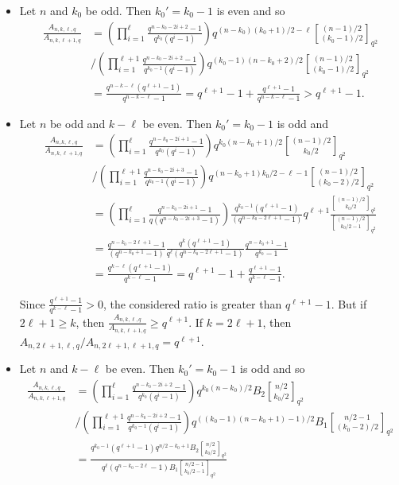 \documentclass[a4paper,11pt]{article}
\begin{document}
\begin{itemize}
Otherwise, if $n\equiv 2\pmod 4$ and $q\equiv 3\pmod 4$, then $\eta((-1)^{n/2})=-1$, therefore
$$\frac{A_{n,k,\ell,q}}{A_{n,k,\ell+1,q}}= \frac{q^{n/2-\ell-1}}{q^{n/2-\ell-1}-1}(q^{\ell+1}-1)> q^{\ell+1}-1.$$


\item Let $n$ and $k_0$ be odd. Then $k_0'=k_0-1$ is even and so %
\begin{align*}
  \frac{A_{n,k,\ell,q}}{A_{n,k,\ell+1,q}} & =\left(\prod_{i=1}^{\ell}\frac{q^{n-k_0-2i+2}-1}{q^{k_0}(q^i-1)}\right)q^{(n-k_0)(k_0+1)/2-\ell}{(n-1)/2\brack(k_0-1)/2 }_{q^2}\\ &/\left(\prod_{i=1}^{\ell+1}\frac{q^{n-k_0-2i+2}-1}{q^{k_0-1}(q^i-1)}\right)q^{(k_0-1)(n-k_0+2)/2}{(n-1)/2\brack (k_0-1)/2 }_{q^2} \\
  & =\frac{q^{n-k-\ell}(q^{\ell+1}-1)}{q^{n-k-\ell}-1}=q^{\ell+1}-1+\frac{q^{\ell+1}-1}{q^{n-k-\ell}-1}>q^{\ell+1}-1.
\end{align*}

\item Let $n$ be odd and $k-\ell$ be even. Then $k_0'=k_0-1$ is odd and  %
\begin{align*}
  \frac{A_{n,k,\ell,q}}{A_{n,k,\ell+1,q}} & =\left(\prod_{i=1}^\ell\frac{q^{n-k_0-2i+1}-1}{q^{k_0}(q^i-1)}\right)q^{k_0(n-k_0+1)/2}{(n-1)/2\brack k_0/2 }_{q^2}\\ &/\left(\prod_{i=1}^{\ell+1}\frac{q^{n-k_0-2i+3}-1}{q^{k_0-1}(q^i-1)}\right)q^{(n-k_0+1)k_0/2-\ell-1}{(n-1)/2\brack(k_0-2)/2 }_{q^2} \\
  &=\left(\prod_{i=1}^\ell\frac{q^{n-k_0-2i+1}-1}{q(q^{n-k_0-2i+3}-1)}\right)\frac{q^{k_0-1}(q^{\ell+1}-1)}{(q^{n-k_0-2\ell+1}-1)}q^{\ell+1}\frac{{(n-1)/2\brack k_0/2 }_{q^2}}{{(n-1)/2\brack k_0/2-1 }_{q^2}}\\
  &=\frac{q^{n-k_0-2\ell+1}-1}{(q^{n-k_0+1}-1)}\frac{q^{k}(q^{\ell+1}-1)}{q^\ell(q^{n-k_0-2\ell+1}-1)}\frac{q^{n-k_0+1}-1}{q^{k_0}-1}\\
  &=\frac{q^{k-\ell}(q^{\ell+1}-1)}{q^{k-\ell}-1}=q^{\ell+1}-1+\frac{q^{\ell+1}-1}{q^{k-\ell}-1}.
\end{align*}

Since $\frac{q^{\ell+1}-1}{q^{k-\ell}-1}>0$, the considered ratio is greater than $q^{\ell+1}-1$. But if $2\ell+1\ge k$, then $\frac{A_{n,k,\ell,q}}{A_{n,k,\ell+1,q}}\ge q^{\ell+1}$. If $k=2\ell+1$, then $A_{n,2\ell+1,\ell,q}/A_{n,2\ell+1,\ell+1,q}=q^{\ell+1}.$

\item Let $n$ and $k-\ell$ be even. Then $k_0'=k_0-1$ is odd and so %
\begin{align*}
  \frac{A_{n,k,\ell,q}}{A_{n,k,\ell+1,q}} & =\left(\prod_{i=1}^{\ell}\frac{q^{n-k_0-2i+2}-1}{q^{k_0}(q^i-1)}\right)q^{k_0(n-k_0)/2}B_2{n/2\brack k_0/2 }_{q^2}\\ &/\left(\prod_{i=1}^{\ell+1}\frac{q^{n-k_0-2i+2}-1}{q^{k_0-1}(q^i-1)}\right)q^{((k_0-1)(n-k_0+1)-1)/2}B_1{n/2-1\brack(k_0-2)/2 }_{q^2} \\
  &=\frac{q^{k_0-1}(q^{\ell+1}-1)q^{n/2-k_0+1}B_2{n/2\brack k_0/2 }_{q^2}}{q^\ell(q^{n-k_0-2\ell}-1)B_1{n/2-1\brack k_0/2-1 }_{q^2}}
\end{align*}


\end{itemize}
\end{document}
